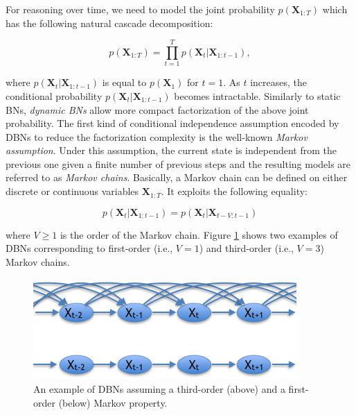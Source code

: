 For reasoning over time, we need to model the joint probability $p(\bm X_{1:T})$ which has the following natural cascade decomposition:

$$p(\bm X_{1:T})  = \prod_{t=1}^T p(\bm X_t|\bm X_{1:t-1}),$$

\noindent where $p(\bm X_t|\bm X_{1:t-1})$ is equal to $p(\bm X_1)$ for $t=1$. As $t$ increases, the conditional probability $p(\bm X_t|\bm X_{1:t-1})$ becomes intractable. Similarly to static BNs, \textit{dynamic BNs} allow more compact factorization of the above joint probability. The first kind of conditional independence assumption encoded by DBNs to reduce the factorization complexity is the well-known \textit{Markov assumption}. Under this assumption, the current state is independent from the previous one given a finite number of previous steps and the resulting models are referred to as \textit{Markov chains}. Basically, a Markov chain can be defined on either discrete or continuous variables $\bm X_{1:T}$. It exploits the following equality:

$$p(\bm X_t| \bm X_{1:t-1})  = p(\bm X_t|\bm X_{t-V:t-1})$$

\noindent where $V\geq 1$ is the order of the Markov chain. Figure \ref{Figure:markovChain} shows two examples of DBNs corresponding to first-order (i.e., $V=1$) and third-order (i.e., $V=3$) Markov chains. 

\begin{figure}[ht!]
\begin{center}
\includegraphics[scale=0.56]{./figures/PreliminariesMarkovChain}
\caption{\label{Figure:markovChain} An example of DBNs assuming a third-order (above) and a first-order (below) Markov property.
}
\end{center}
\end{figure}

